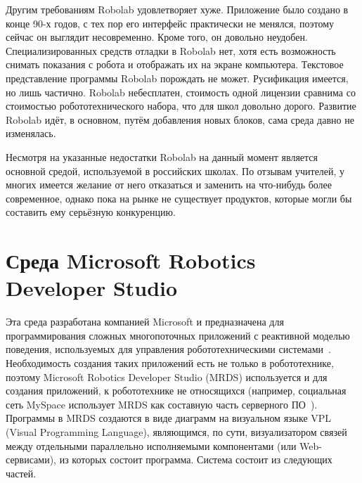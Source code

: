 \documentclass[a4paper]{article}
\begin{document}
Другим требованиям Robolab удовлетворяет хуже. Приложение было создано в конце 90-х годов, с тех пор его интерфейс практически не менялся, поэтому сейчас он выглядит несовременно. Кроме того, он довольно неудобен. Специализированных средств отладки в Robolab нет, хотя есть возможность снимать показания с робота и отображать их на экране компьютера. Текстовое представление программы Robolab порождать не может. Русификация имеется, но лишь частично. Robolab небесплатен, стоимость одной лицензии сравнима со стоимостью робототехнического набора, что для школ довольно дорого. Развитие Robolab идёт, в основном, путём добавления новых блоков, сама среда давно не изменялась.

Несмотря на указанные недостатки Robolab на данный момент является основной средой, используемой в российских школах. По отзывам учителей, у многих имеется желание от него отказаться и заменить на что-нибудь более современное, однако пока на рынке не существует продуктов, которые могли бы составить ему серьёзную конкуренцию.

\section{Среда Microsoft Robotics Developer Studio}
Эта среда разработана компанией Microsoft и предназначена для программирования сложных многопоточных приложений с реактивной моделью поведения, используемых для управления робототехническими системами~\cite{mrds}. Необходимость создания таких приложений есть не только в робототехнике, поэтому Microsoft Robotics Developer Studio (MRDS) используется и для создания приложений, к робототехнике не относящихся (например, социальная сеть MySpace использует MRDS как составную часть серверного ПО~\cite{mrdsAtMySpace}). Программы в MRDS создаются  в виде диаграмм на визуальном языке VPL (Visual Programming Language), являющимся, по сути, визуализатором связей между отдельными параллельно исполняемыми компонентами (или Web-сервисами), из которых состоит программа. Система состоит из следующих частей.
\end{document}
